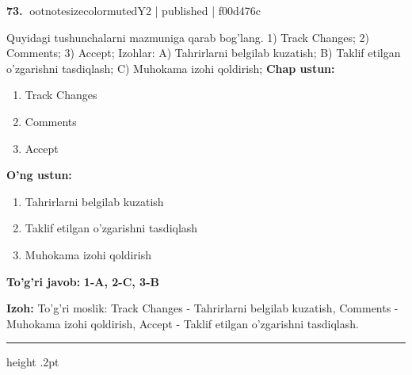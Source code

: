 \documentclass[10pt,a4paper]{article}
\begin{document}
\textbf{\color{ink}73.} {ootnotesizecolor{muted}Y2 | published | f00d476c}
\par
Quyidagi tushunchalarni mazmuniga qarab bog'lang.  1) Track Changes;  2) Comments;  3) Accept;  Izohlar: A) Tahrirlarni belgilab kuzatish;  B) Taklif etilgan o'zgarishni tasdiqlash;  C) Muhokama izohi qoldirish;
\textbf{Chap ustun:}\begin{enumerate}[label=\arabic*),leftmargin=9mm]
\item Track Changes
\item Comments
\item Accept
\end{enumerate}
\textbf{O'ng ustun:}\begin{enumerate}[label=\Alph*),leftmargin=9mm]
\item Tahrirlarni belgilab kuzatish
\item Taklif etilgan o'zgarishni tasdiqlash
\item Muhokama izohi qoldirish
\end{enumerate}
\begin{tcolorbox}[enhanced,breakable,colback=teal!4,colframe=teal!55!black,boxrule=0.45pt,arc=1.2mm,left=2.8mm,right=2.8mm,top=2mm,bottom=2mm]
\textbf{\color{teal}To'g'ri javob:} \textbf{1-A, 2-C, 3-B}
\par\smallskip
\textbf{Izoh:} To'g'ri moslik: Track Changes - Tahrirlarni belgilab kuzatish, Comments - Muhokama izohi qoldirish, Accept - Taklif etilgan o'zgarishni tasdiqlash.
\end{tcolorbox}
\vspace{2mm}\hrule height .2pt\vspace{2mm}
\end{document}
